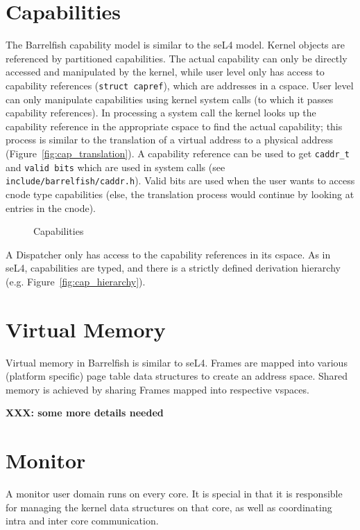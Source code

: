 \documentclass[a4paper,twoside]{report} %
\begin{document}
\section{Capabilities}

The Barrelfish capability model is similar to the seL4 model. Kernel objects are
referenced by partitioned capabilities. The actual capability can only be
directly accessed and manipulated by the kernel, while user level only has
access to capability references (\texttt{struct capref}), which are addresses in
a cspace. User level can only manipulate capabilities using kernel system calls
(to which it passes capability references). In processing a system call the
kernel looks up the capability reference in the appropriate cspace to find the
actual capability; this process is similar to the translation of a virtual
address to a physical address (Figure~\ref{fig:cap_translation}). A capability
reference can be used to get \texttt{caddr\_t} and \texttt{valid bits} which are
used in system calls (see \texttt{include/barrelfish/caddr.h}).  Valid bits are
used when the user wants to access cnode type capabilities (else, the
translation process would continue by looking at entries in the cnode).

 
\begin{figure}
  \centering
  \quad
  \caption{Capabilities}
  \label{fig:caps}
\end{figure}

A Dispatcher only has access to the capability references in its cspace. As in
seL4, capabilities are typed, and there is a strictly defined derivation
hierarchy (e.g. Figure~\ref{fig:cap_hierarchy}).

\section{Virtual Memory}
Virtual memory in Barrelfish is similar to seL4. Frames are mapped into various
(platform specific) page table data structures to create an address
space. Shared memory is achieved by sharing Frames mapped into respective
vspaces.

\textbf{XXX: some more details needed}

\section{Monitor}
A monitor user domain runs on every core. It is special in that it is
responsible for managing the kernel data structures on that core, as well as
coordinating intra and inter core communication.
\end{document}

